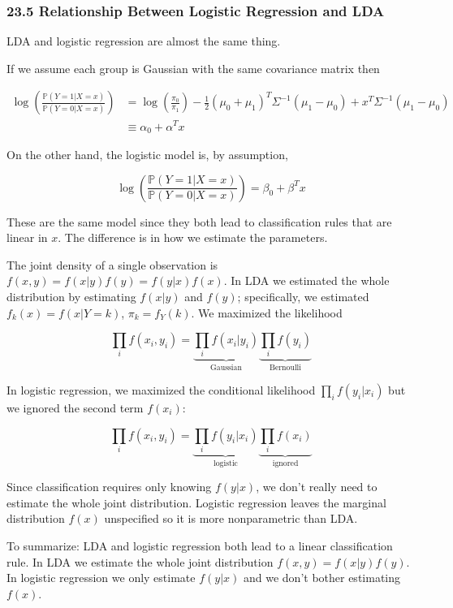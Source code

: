 \subsubsection{23.5 Relationship Between Logistic Regression and LDA}\label{relationship-between-logistic-regression-and-lda}

LDA and logistic regression are almost the same thing.

If we assume each group is Gaussian with the same covariance matrix then

\[ 
\begin{align}
\log \left( \frac{\mathbb{P}(Y = 1 | X = x)}{\mathbb{P}(Y = 0 | X = x)} \right) 
&= \log \left( \frac{\pi_0}{\pi_1} \right) - \frac{1}{2} (\mu_0 + \mu_1)^T \Sigma^{-1} (\mu_1 - \mu_0) + x^T \Sigma^{-1}( \mu_1 - \mu_0) \\
&\equiv \alpha_0 + \alpha^T x
\end{align}
\]

On the other hand, the logistic model is, by assumption,

\[ \log \left( \frac{\mathbb{P}(Y = 1 | X = x)}{\mathbb{P}(Y = 0 | X = x)} \right) = \beta_0 + \beta^T x \]

These are the same model since they both lead to classification rules
that are linear in \(x\). The difference is in how we estimate the
parameters.

The joint density of a single observation is
\(f(x, y) = f(x | y) f(y) = f(y | x) f(x)\). In LDA we estimated the
whole distribution by estimating \(f(x | y)\) and \(f(y)\);
specifically, we estimated \(f_k(x) = f(x | Y = k)\),
\(\pi_k = f_Y(k)\). We maximized the likelihood

\[ \prod_i f(x_i, y_i) = \underbrace{\prod_i f(x_i | y_i)}_\text{Gaussian} \underbrace{ \prod_i f(y_i) }_\text{Bernoulli}\]

In logistic regression, we maximized the conditional likelihood
\(\prod_i f(y_i | x_i)\) but we ignored the second term \(f(x_i)\):

\[ \prod_i f(x_i, y_i) = \underbrace{\prod_i f(y_i | x_i)}_\text{logistic} \underbrace{ \prod_i f(x_i) }_\text{ignored}\]

Since classification requires only knowing \(f(y | x)\), we don't really
need to estimate the whole joint distribution. Logistic regression
leaves the marginal distribution \(f(x)\) unspecified so it is more
nonparametric than LDA.

To summarize: LDA and logistic regression both lead to a linear
classification rule. In LDA we estimate the whole joint distribution
\(f(x, y) = f(x | y) f(y)\). In logistic regression we only estimate
\(f(y | x)\) and we don't bother estimating \(f(x)\).


